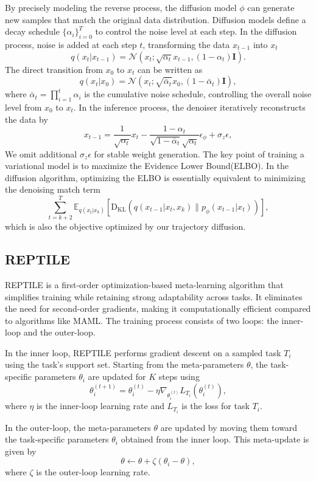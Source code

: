 By precisely modeling the reverse process, the diffusion model $\phi$ can generate new samples that match the original data distribution. Diffusion models define a decay schedule $\{\alpha_i\}_{i=0}^T$ to control the noise level at each step. In the diffusion process, noise is added at each step $t$, transforming the data $x_{t-1}$ into $x_t$
\[
q(x_t | x_{t-1}) = \mathcal{N}(x_t; \sqrt{\alpha_t} x_{t-1}, (1-\alpha_t) \mathbf{I}).
\]
The direct transition from $x_0$ to $x_t$ can be written as
\[
q(x_t | x_0) = \mathcal{N}(x_t; \sqrt{\bar{\alpha}_t} x_0, (1 - \bar{\alpha}_t) \mathbf{I}),
\]
where $\bar{\alpha}_t = \prod_{i=1}^t \alpha_i$ is the cumulative noise schedule, controlling the overall noise level from $x_0$ to $x_t$.
In the inference process, the denoiser iteratively reconstructs the data by 
$$
x_{t-1}=\frac{1}{\sqrt{\alpha_t}}x_t - \frac{1 - \alpha_t}{\sqrt{1 - \bar{\alpha}_t} \sqrt{\alpha_t}}\epsilon_{\phi}+\sigma_z\epsilon,
$$
We omit additional $\sigma_z\epsilon$ for stable weight generation. The key point of training a variational model is to maximize the Evidence Lower Bound(ELBO). In the diffusion algorithm, optimizing the ELBO is essentially equivalent to minimizing the denoising match term
$$
    \sum_{t=k+2}^{T} \mathbb{E}_{q(x_t | x_k)} \left[ \mathrm{D}_{\mathrm{KL}}\left( q(x_{t-1} | x_t, x_k) \parallel p_{\phi}(x_{t-1} | x_t) \right) \right],
$$
which is also the objective optimized by our trajectory diffusion.
\subsection{REPTILE}
REPTILE is a first-order optimization-based meta-learning algorithm that simplifies training while retaining strong adaptability across tasks. It eliminates the need for second-order gradients, making it computationally efficient compared to algorithms like MAML. The training process consists of two loops: the inner-loop and the outer-loop.

In the inner loop, REPTILE performs gradient descent on a sampled task \( {T}_i \) using the task’s support set. Starting from the meta-parameters \( \theta \), the task-specific parameters \( \theta_i \) are updated for \( K \) steps using
\[
\theta_i^{(t+1)} = \theta_i^{(t)} - \eta \nabla_{\theta_i^{(t)}} {L}_{{T}_i}(\theta_i^{(t)}),
\]
where \( \eta \) is the inner-loop learning rate and \( {L}_{{T}_i} \) is the loss for task \( {T}_i \). 

In the outer-loop, the meta-parameters \( \theta \) are updated by moving them toward the task-specific parameters \( \theta_i \) obtained from the inner loop. This meta-update is given by
\[
\theta \leftarrow \theta + \zeta (\theta_i - \theta),
\]
where \( \zeta \) is the outer-loop learning rate. 


